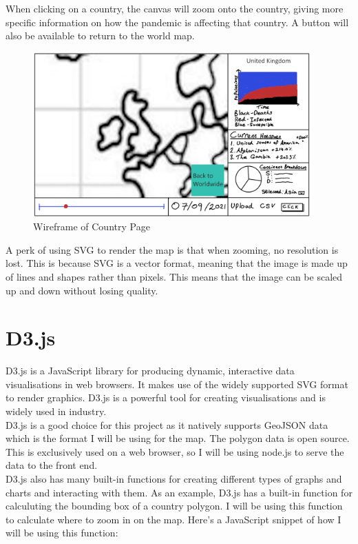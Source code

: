\documentclass{report}
\begin{document}
When clicking on a country, the canvas will zoom onto the country, giving more specific information on how the pandemic is affecting that country. A button will also be available to return to the world map.
\begin{center}
    \begin{figure}[h]
        \centering
        \includegraphics[width=0.95\textwidth]{Images/Country_Wireframe.png}
        \caption{Wireframe of Country Page}
        \label{fig:wireframe_country}
    \end{figure}
\end{center}
A perk of using SVG to render the map is that when zooming, no resolution is lost. This is because SVG is a vector format, meaning that the image is made up of lines and shapes rather than pixels. This means that the image can be scaled up and down without losing quality.
\section{D3.js}
D3.js is a JavaScript library for producing dynamic, interactive data visualisations in web browsers. It makes use of the widely supported SVG format to render graphics. D3.js is a powerful tool for creating visualisations and is widely used in industry.\\

D3.js is a good choice for this project as it natively supports GeoJSON data which is the format I will be using for the map. The polygon data is open source. \cite{geojsonvectormaps}\\

This is exclusively used on a web browser, so I will be using node.js to serve the data to the front end.\\

D3.js also has many built-in functions for creating different types of graphs and charts and interacting with them. As an example, D3.js has a built-in function for calculuting the bounding box of a country polygon. I will be using this function to calculate where to zoom in on the map. Here's a JavaScript snippet of how I will be using this function:
\end{document}

